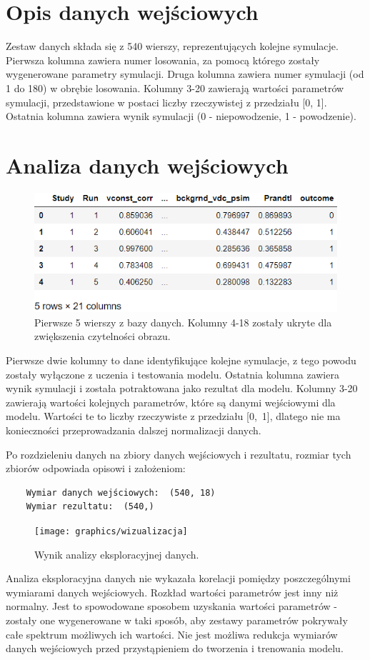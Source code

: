 \documentclass[11pt, a4paper, notitlepage]{report}
\begin{document}
\section{Opis danych wejściowych}
Zestaw danych składa się z 540 wierszy, reprezentujących kolejne symulacje. Pierwsza kolumna zawiera numer losowania, za pomocą którego zostały wygenerowane parametry symulacji. Druga kolumna zawiera numer symulacji (od 1 do 180) w obrębie losowania. Kolumny 3-20 zawierają wartości parametrów symulacji, przedstawione w postaci liczby rzeczywistej z przedziału [0, 1]. Ostatnia kolumna zawiera wynik symulacji (0 - niepowodzenie, 1 - powodzenie).
\section{Analiza danych wejściowych}
\begin{figure}[H]
	\centering
	\captionsetup{justification=centering}
	\includegraphics{graphics/data_head}
	\caption{Pierwsze 5 wierszy z bazy danych. Kolumny 4-18 zostały ukryte dla zwiększenia czytelności obrazu.}
\end{figure}
Pierwsze dwie kolumny to dane identyfikujące kolejne symulacje, z tego powodu zostały wyłączone z uczenia i testowania modelu. Ostatnia kolumna zawiera wynik symulacji i została potraktowana jako rezultat dla modelu. Kolumny 3-20 zawierają wartości kolejnych parametrów, które są danymi wejściowymi dla modelu. Wartości te to liczby rzeczywiste z przedziału [0,~1], dlatego nie ma konieczności przeprowadzania dalszej normalizacji danych.\par
Po rozdzieleniu danych na zbiory danych wejściowych i rezultatu, rozmiar tych zbiorów odpowiada opisowi i założeniom:
\begin{verbatim}
	Wymiar danych wejściowych:  (540, 18)
	Wymiar rezultatu:  (540,)
\end{verbatim}
\begin{figure}[H]
	\centering
	\captionsetup{justification=centering}
	\texttt{[image: graphics/wizualizacja]}
	\caption{Wynik analizy eksploracyjnej danych.}
\end{figure}\par
Analiza eksploracyjna danych nie wykazała korelacji pomiędzy poszczególnymi wymiarami danych wejściowych. Rozkład wartości parametrów jest inny niż normalny. Jest to spowodowane sposobem uzyskania wartości parametrów - zostały one wygenerowane w taki sposób, aby zestawy parametrów pokrywały całe spektrum możliwych ich wartości. Nie jest możliwa redukcja wymiarów danych wejściowych przed przystąpieniem do tworzenia i trenowania modelu.
\end{document}
